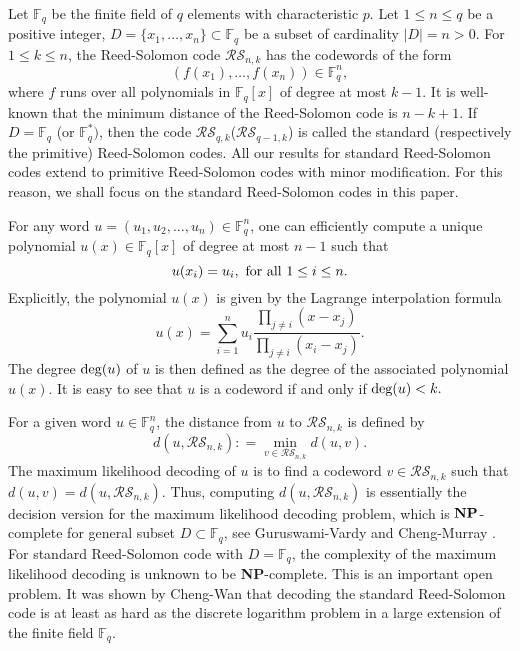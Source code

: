 \documentclass[reqno]{amsart}
\theoremstyle{remark}
\numberwithin{equation}{section}
\newcommand{\de}{\textup{deg}}
\newcommand{\f}{\mathbb{F}_q}
\begin{document}


Let $\f$ be the finite field of $q$ elements with characteristic $p$.
Let $1\leq n\leq q$ be a positive integer,
$D=\{x_1,\ldots, x_n\} \subset \f$ be a subset of
cardinality $|D|=n>0$. For $1\leq k\leq n$, the Reed-Solomon code
$\mathcal{RS}_{n,k}$ has the codewords of the form
$$(f(x_1), \ldots, f(x_n))\in \f^n,$$
where $f$ runs over all polynomials in $\f[x]$ of degree at
most $k-1$. It is well-known that the minimum distance of the Reed-Solomon code is $n-k+1$.
If $D=\f$ (or $\f^*)$, then the code $\mathcal{RS}_{q,k}$($\mathcal{RS}_{q-1,k}$) is called the standard (respectively the primitive)
Reed-Solomon codes. All our results for standard Reed-Solomon codes extend to
primitive Reed-Solomon codes with minor modification. For this reason, we shall focus on the standard
Reed-Solomon codes in this paper.

For  any word $u=(u_1,u_2,\ldots,u_{n})\in \f^n$,  one can efficiently
compute a unique polynomial $u(x)\in \f[x]$ of degree
at most $n-1$ such that
$$u(x_i)=u_i,  \ { \rm for ~ all} ~1\leq i\leq n.$$Explicitly, the
polynomial $u(x)$ is given by the Lagrange interpolation formula
$$u(x) = \sum_{i=1}^n u_i \frac{\prod_{j\not=i}(x-x_j)}{\prod_{j\not=i}(x_i-x_j)}.$$
The degree  $\de(u)$ of $u$ is then defined as the degree of the associated polynomial $u(x)$. It is easy to see that $u$ is a codeword if and only if $\de(u)<k.$

For a given word $u\in \f^n$,  the distance from $u$ to $\mathcal{RS}_{n,k}$ is defined by
$$d(u, \mathcal{RS}_{n,k}): = \min_{v\in \mathcal{RS}_{n,k}}d(u,v).$$
The maximum likelihood decoding of $u$ is to find a codeword $v\in
\mathcal{RS}_{n,k}$ such that $d(u,v) = d(u, \mathcal{RS}_{n,k})$. Thus, computing
$d(u, \mathcal{RS}_{n,k})$ is essentially the decision version for the maximum likelihood decoding problem, which is ${\bf NP}$-complete for
general subset $D\subset \f$, see Guruswami-Vardy \cite{GV} and Cheng-Murray \cite{CM}. For standard Reed-Solomon code
with $D=\f$, the complexity of the maximum
likelihood decoding is unknown to be {\bf NP}-complete. This is an
important open problem. It was shown by Cheng-Wan
\cite{CW1,CW2} that decoding the standard Reed-Solomon code is at least as hard as the discrete logarithm
problem in a large extension of the finite field $\f$.
\end{document}
